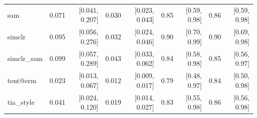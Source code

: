 \begin{tabular}{lrrrrrrrr}
sam & 0.071 & [0.041, 0.207] & 0.030 & [0.023, 0.043] & 0.85 & [0.59, 0.98] & 0.86 & [0.59, 0.98] \\
simclr & 0.095 & [0.056, 0.276] & 0.032 & [0.024, 0.046] & 0.90 & [0.70, 0.99] & 0.90 & [0.69, 0.98] \\
simclr\_sam & 0.099 & [0.057, 0.289] & 0.043 & [0.033, 0.062] & 0.84 & [0.58, 0.98] & 0.85 & [0.56, 0.97] \\
tent@erm & 0.023 & [0.013, 0.067] & 0.012 & [0.009, 0.017] & 0.79 & [0.48, 0.97] & 0.84 & [0.50, 0.98] \\
tia\_style & 0.041 & [0.024, 0.120] & 0.019 & [0.014, 0.027] & 0.83 & [0.55, 0.98] & 0.86 & [0.56, 0.98] \\
\bottomrule
\end{tabular}

